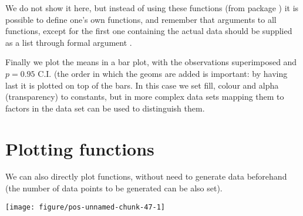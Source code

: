 \documentclass[paper=a4,10pt,div=17,headsepline,BCOR=12mm,twoside,open=right]{scrbook}\usepackage{knitr}
\begin{document}
We do not show it here, but instead of using these functions (from package \Hmisc) it is possible to define one's own functions, and remember that arguments to all functions, except for the first one containing the actual data should be supplied as a list through formal argument .

Finally we plot the means in a bar plot, with the observations superimposed and $p = 0.95$ C.I. (the order in which the geoms are added is important: by having  last it is plotted on top of the bars. In this case we set fill, colour and alpha (transparency) to constants, but in more complex data sets mapping
them to factors in the data set can be used to distinguish them.

\begin{knitrout}\footnotesize
{}\color{fgcolor}\begin{kframe}
\begin{alltt}
\hlstd{(} \hlstd{(}  \hlopt{+}
  \hlstd{(} \hlstd{=} \hlstd{,}  \hlstd{=} \hlstd{,}
               \hlstd{=}\hlstd{,} \hlstd{=}\hlstd{)} \hlopt{+}
  \hlstd{(} \hlstd{=} \hlstd{,}
                \hlstd{=} \hlstd{,}  \hlstd{=} \hlstd{,}
               \hlstd{=}\hlstd{,} \hlstd{=}\hlstd{,} \hlstd{=}\hlstd{)} \hlopt{+}
  \hlstd{(}\hlstd{=}\hlstd{,} \hlstd{=}\hlstd{)}
\end{alltt}
\end{kframe}
\end{knitrout}

\section{Plotting functions}

We can also directly plot functions, without need to generate data beforehand (the number of data points to be generated can be also set).

\begin{knitrout}\footnotesize
{}\color{fgcolor}\begin{kframe}
\begin{alltt}
\hlstd{(}\hlstd{(}\hlstd{=}\hlopt{-}\hlopt{:}\hlstd{),} \hlstd{(} \hlopt{+}
  \hlstd{(}
\end{alltt}
\end{kframe}

{\centering \texttt{[image: figure/pos-unnamed-chunk-47-1]} 

}



\end{knitrout}
\end{document}
